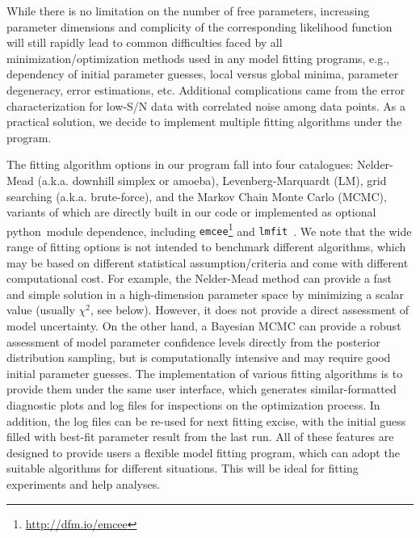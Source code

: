 \documentclass[twocolumn,tighten]{aastex62}
\newcommand{\python}{{\sc python}}
\newcommand{\emcee}{{\tt emcee}}
\newcommand{\lmfit}{{\tt lmfit}}
\begin{document}
While there is no limitation on the number of free parameters, increasing parameter dimensions and complicity of the corresponding likelihood function will still rapidly lead to common difficulties faced by all minimization/optimization methods used in any model fitting programs, e.g., dependency of initial parameter guesses,  local versus global minima, parameter degeneracy, error estimations, etc. Additional complications came from the error characterization for low-S/N data with correlated noise among data points.
As a practical solution, we decide to implement multiple fitting algorithms under the program.

The fitting  algorithm options in our program fall into four catalogues: Nelder-Mead (a.k.a. downhill simplex or amoeba), Levenberg-Marquardt (LM), grid searching (a.k.a. brute-force), and the Markov Chain Monte Carlo (MCMC), variants of which are directly built in our code or implemented as optional \python\ module dependence, including \emcee \footnote{\url{http://dfm.io/emcee}} \citep{Foreman-Mackey:2013aa} and \lmfit\ \citep{Newville:2016aa}.
We note that the wide range of fitting options is not intended to benchmark different algorithms, which may be based on different statistical assumption/criteria and come with different computational cost.
For example, the Nelder-Mead method can provide a fast and simple solution in a high-dimension parameter space by minimizing a scalar value (usually $\chi^2$, see below). However, it does not provide a direct assessment of model uncertainty.
On the other hand, a Bayesian MCMC can provide a robust assessment of model parameter confidence levels directly from the posterior distribution sampling, but is computationally intensive and may require good initial parameter guesses.
The implementation of various fitting algorithms is to provide them under the same user interface, which generates similar-formatted diagnostic plots and log files for inspections on the optimization process. 
In addition, the log files can be re-used for next fitting excise, with the initial guess filled with best-fit parameter result from the last run. 
All of these features are designed to provide users a flexible model fitting program, which can adopt the suitable algorithms for different situations.
This will be ideal for fitting experiments and help analyses.

\end{document}
